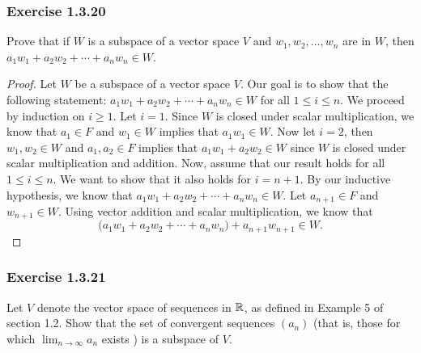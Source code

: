\subsubsection{Exercise 1.3.20} Prove that if \( W  \) is a subspace of a vector space \( V  \) and \( w_{1} , w_{2} , \dots, w_{n}  \) are in \( W  \), then \( a_{1} w_{1} + a_{2} w_{2} + \cdots + a_{n} w_{n} \in W   \).
\begin{proof}
Let \( W  \) be a subspace of a vector space \( V \). Our goal is to show that the following statement: \( a_{1} w_{1} + a_{2} w_{2} + \cdots + a_{n} w_{n} \in W  \) for all \( 1 \leq i  \leq n \). We proceed by induction on \( i \geq 1  \). Let \( i = 1  \). Since \( W  \) is closed under scalar multiplication, we know that \( a_{1} \in F  \) and \( w_{1} \in W  \) implies that \( a_{1} w_{1} \in W  \). Now let \( i = 2  \), then \( w_{1}, w_{2} \in W  \) and \( a_{1}, a_{2} \in F  \) implies that \( a_{1} w_{1} + a_{2} w_{2} \in W  \) since \( W  \) is closed under scalar multiplication and addition. Now, assume that our result holds for all \( 1 \leq i \leq  n  \). We want to show that it also holds for \( i = n + 1  \). By our inductive hypothesis, we know that \( a_{1} w_{1} + a_{2} w_{2} + \cdots + a_{n} w_{n} \in W  \). Let \( a_{n+1} \in F   \) and \( w_{n+1 } \in W  \). Using vector addition and scalar multiplication, we know that 
\[  \Big( a_{1} w_{1} + a_{2} w_{2} + \cdots + a_{n} w_{n} \Big)  + a_{n+1} w_{n+1} \in W. \]
\end{proof}

\subsubsection{Exercise 1.3.21} Let \( V  \) denote the vector space of sequences in  \( \mathbb{R}  \), as defined in Example 5 of section 1.2. Show that the set of convergent sequences \( (a_{n}) \) (that is, those for which \( \lim_{ n \to \infty  } a_{n}  \) exists ) is a subspace of \( V  \).

